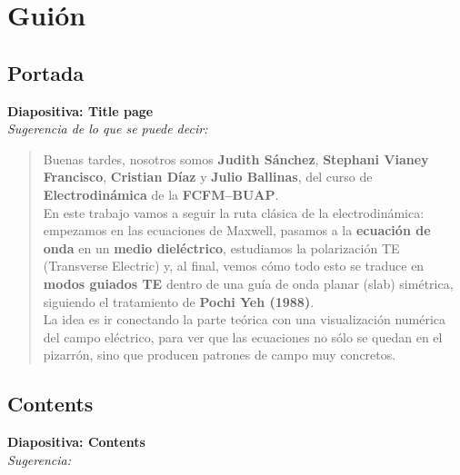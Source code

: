 \documentclass{article}
\begin{document}
\section*{Guión}

\subsection*{Portada}

\noindent
\textbf{Diapositiva: Title page}\\[2mm]
\textit{Sugerencia de lo que se puede decir:}\\[2mm]

\begin{quote}
Buenas tardes, nosotros somos \textbf{Judith Sánchez}, \textbf{Stephani Vianey Francisco}, 
\textbf{Cristian Díaz} y \textbf{Julio Ballinas}, del curso de \textbf{Electrodinámica} de la 
\textbf{FCFM--BUAP}.\\[2mm]
En este trabajo vamos a seguir la ruta clásica de la electrodinámica: empezamos en las 
\textcolor{Apple Green}{ecuaciones de Maxwell}, pasamos a la \textbf{ecuación de onda} en un 
\textbf{medio dieléctrico}, estudiamos la \textcolor{Apple Green}{polarización TE} (Transverse Electric) 
y, al final, vemos cómo todo esto se traduce en \textbf{modos guiados TE} dentro de una 
\textcolor{Tarawera}{guía de onda planar (slab) simétrica}, siguiendo el tratamiento de 
\textbf{Pochi Yeh (1988)}.\\[2mm]
La idea es ir conectando la parte teórica con una visualización numérica del campo eléctrico, 
para ver que las ecuaciones no sólo se quedan en el pizarrón, sino que producen patrones de 
campo muy concretos.
\end{quote}

\vspace{0.8cm}

\subsection*{Contents}

\noindent
\textbf{Diapositiva: Contents}\\[2mm]
\textit{Sugerencia:}\\[2mm]
\end{document}
